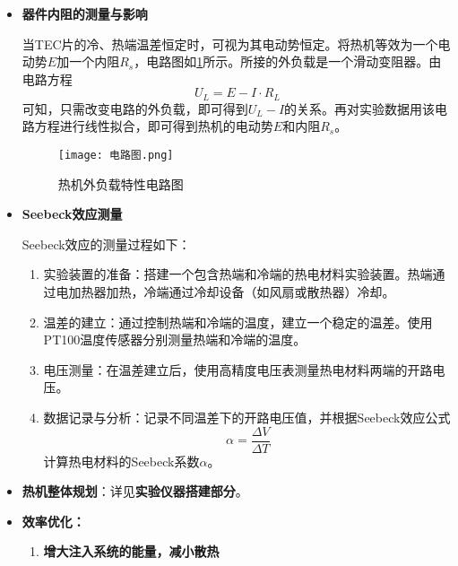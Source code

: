 \documentclass[dvipsnames, svgnames,a4paper,11pt]{article}
\begin{document}
        \begin{itemize}
            \item \textbf{器件内阻的测量与影响}
            
                当TEC片的冷、热端温差恒定时，可视为其电动势恒定。将热机等效为一个电动势$E$加一个内阻$R_s$，电路图如\cref{fig:电路图}所示。所接的外负载是一个滑动变阻器。由电路方程
                \[
                    U_L = E - I \cdot R_L
                \]
                可知，只需改变电路的外负载，即可得到$U_L - I$的关系。再对实验数据用该电路方程进行线性拟合，即可得到热机的电动势$E$和内阻$R_s$。

                \begin{figure}[htbp]
                    \centering
                    \texttt{[image: 电路图.png]}
                    \caption{热机外负载特性电路图}
                    \label{fig:电路图}
                \end{figure}

            \item \textbf{Seebeck效应测量}
            

                Seebeck效应的测量过程如下：

                \begin{enumerate}
                    \item 实验装置的准备：搭建一个包含热端和冷端的热电材料实验装置。热端通过电加热器加热，冷端通过冷却设备（如风扇或散热器）冷却。
                    \item 温差的建立：通过控制热端和冷端的温度，建立一个稳定的温差。使用PT100温度传感器分别测量热端和冷端的温度。
                    \item 电压测量：在温差建立后，使用高精度电压表测量热电材料两端的开路电压。
                    \item 数据记录与分析：记录不同温差下的开路电压值，并根据Seebeck效应公式
                    \[
                    \alpha = \frac{\Delta V}{\Delta T}
                    \]
                    计算热电材料的Seebeck系数$\alpha$。
                \end{enumerate}

            \item \textbf{热机整体规划}：详见\textbf{实验仪器搭建部分}。
            
            \item \textbf{效率优化：}
        
            \begin{enumerate}
                \item \textbf{增大注入系统的能量，减小散热}
                

\end{enumerate}
\end{itemize}
\end{document}
